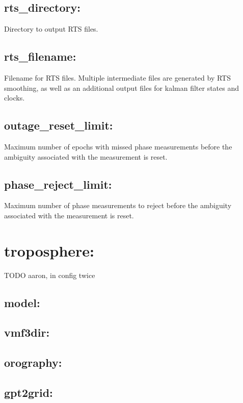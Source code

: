 \subsection{rts\_directory:}
Directory to output RTS files.

\subsection{rts\_filename:}
Filename for RTS files. Multiple intermediate files are generated by RTS smoothing, as well as an additional output files for kalman filter states and clocks.

\subsection{outage\_reset\_limit:}
Maximum number of epochs with missed phase measurements before the ambiguity associated with the measurement is reset.

\subsection{phase\_reject\_limit:}
Maximum number of phase measurements to reject before the ambiguity associated with the measurement is reset.








\section{troposphere:}	TODO aaron, in config twice

\subsection{model:}

\subsection{vmf3dir:}

\subsection{orography:}

\subsection{gpt2grid:}




